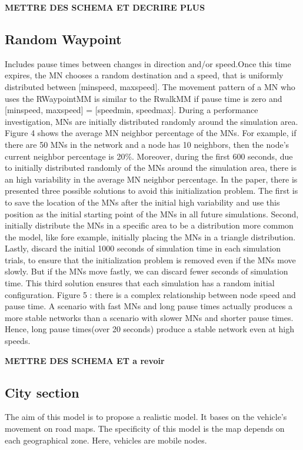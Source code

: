 \textbf{METTRE DES SCHEMA ET DECRIRE PLUS}

\subsection{Random Waypoint}

Includes pause times between changes in direction and/or speed.Once this time expires, the MN chooses a random destination and a speed, that is uniformly distributed between [minspeed, maxspeed]. The movement pattern of a MN who uses the RWaypointMM is similar to the RwalkMM if pause time is zero and [minspeed, maxspeed] = [speedmin, speedmax].
During a performance investigation, MNs are initially distributed randomly around the simulation area. Figure 4 shows the average MN neighbor percentage of the MNs. For example, if there are 50 MNs in the network and a node has 10 neighbors, then the node's current neighbor percentage is 20\%. Moreover, during the first 600 seconds, due to initially distributed randomly of the MNs around the simulation area, there is an high variability in the average MN neighbor percentage.
In the paper, there is presented three possible solutions to avoid this initialization problem. The first is to save the location of the MNs after the initial high variability and use this position as the initial starting point of the MNs in all future simulations. Second, initially distribute the MNs in a specific area to be a distribution more common the model, like fore example, initially placing the MNs in a triangle distribution. Lastly, discard the initial 1000 seconds of simulation time in each simulation trials, to ensure that the initialization problem is removed even if the MNs move slowly. But if the MNs move fastly, we can discard fewer seconds of simulation time. This third solution ensures that each simulation has a random initial configuration.
Figure 5 : there is a complex relationship between node speed and pause time. A scenario with fast MNs and long pause times actually produces a more stable networks than a scenario with slower MNs and shorter pause times. Hence, long pause times(over 20 seconds) produce a stable network even at high speeds.

\textbf{METTRE DES SCHEMA ET a revoir}

\subsection{City section}

The aim of this model is to propose a realistic model. It bases on the vehicle's movement on road maps. The specificity of this model is the map depends on each geographical zone. Here, vehicles are mobile nodes.\\\\

